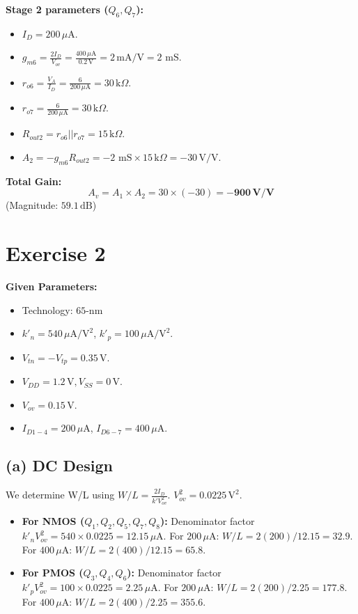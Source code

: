 \documentclass[11pt, a4paper]{article}
\newcommand{\uA}{\,\mu\text{A}}
\newcommand{\mA}{\,\text{mA}}
\newcommand{\kohm}{\,\text{k}\Omega}
\begin{document}
\textbf{Stage 2 parameters ($Q_6, Q_7$):}
\begin{itemize}
    \item $I_D = 200 \uA$.
    \item $g_{m6} = \frac{2 I_D}{V_{ov}} = \frac{400 \uA}{0.2\,\text{V}} = 2 \mA/\text{V} = 2 \text{ mS}$.
    \item $r_{o6} = \frac{V_A}{I_D} = \frac{6}{200 \uA} = 30 \kohm$.
    \item $r_{o7} = \frac{6}{200 \uA} = 30 \kohm$.
    \item $R_{out2} = r_{o6} || r_{o7} = 15 \kohm$.
    \item $A_2 = -g_{m6} R_{out2} = -2 \text{ mS} \times 15 \kohm = -30\,\text{V/V}$.
\end{itemize}

\textbf{Total Gain:}
\[ A_v = A_1 \times A_2 = 30 \times (-30) = \mathbf{-900\,\text{V/V}} \]
(Magnitude: $59.1\,\text{dB}$)

\section*{Exercise 2}

\textbf{Given Parameters:}
\begin{itemize}
    \item Technology: $65\text{-nm}$
    \item $k'_n = 540 \uA/\text{V}^2$, $k'_p = 100 \uA/\text{V}^2$.
    \item $V_{tn} = -V_{tp} = 0.35\,\text{V}$.
    \item $V_{DD} = 1.2\,\text{V}, V_{SS} = 0\,\text{V}$.
    \item $V_{ov} = 0.15\,\text{V}$.
    \item $I_{D1-4} = 200 \uA$, $I_{D6-7} = 400 \uA$.
\end{itemize}

\subsection*{(a) DC Design}

We determine W/L using $W/L = \frac{2 I_D}{k' V_{ov}^2}$.
$V_{ov}^2 = 0.0225\,\text{V}^2$.

\begin{itemize}
    \item \textbf{For NMOS ($Q_1, Q_2, Q_5, Q_7, Q_8$):}
    Denominator factor $k'_n V_{ov}^2 = 540 \times 0.0225 = 12.15 \uA$.
    For $200 \uA$: $W/L = 2(200)/12.15 = 32.9$.
    For $400 \uA$: $W/L = 2(400)/12.15 = 65.8$.
    \item \textbf{For PMOS ($Q_3, Q_4, Q_6$):}
    Denominator factor $k'_p V_{ov}^2 = 100 \times 0.0225 = 2.25 \uA$.
    For $200 \uA$: $W/L = 2(200)/2.25 = 177.8$.
    For $400 \uA$: $W/L = 2(400)/2.25 = 355.6$.
\end{itemize}
\end{document}
